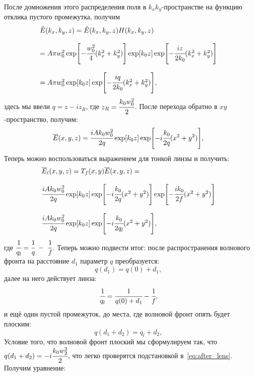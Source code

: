 \documentclass[14pt,a4paper]{extarticle}
\numberwithin{equation}{section}
\begin{document}
После домножения этого распределения поля в $k_xk_y$-пространстве на функцию отклика пустого промежутка, получим
\begin{equation}
	\label{eq:after_lens}
	\begin{array}{lcl}
	\hat{E}(k_x, k_y, z) = \hat{E}(k_x, k_y, z)H(k_x, k_y, z) 
	\\
	\\
	= A\pi w^2_0\exp[-\cfrac{w^2_0}{4}(k_x^2 + k_y^2)]\exp[k_0z]\exp[-\cfrac{iz}{2k_0}(k^2_x + k^2_y)]
	\\
	\\
	= A\pi w^2_0\exp[k_0z]\exp[-\cfrac{iq}{2k_0}(k^2_x + k^2_y)], 
	\end{array}
\end{equation}
здесь мы ввели $q = z - iz_R$, где $z_R = \cfrac{k_0w^2_0}{2}$. После перехода обратно в $xy$-пространство, получим: 
\begin{equation}
	\overline{E}(x, y, z) = \cfrac{iAk_0w^2_0}{2q}\exp[k_0z]\exp[-i\cfrac{k_0}{2q}(x^2 + y^2)],
\end{equation}
Теперь можно воспользоваться выражением для тонкой линзы и получить:
\begin{equation}
	\begin{array}{lcl}
	\overline{E}_{l}(x, y, z) = T_f(x, y)\overline{E}(x, y, z) = 
	\\
	\\
	\cfrac{iAk_0w^2_0}{2q}\exp[k_0z]\exp[-i\cfrac{k_0}{2q}(x^2 + y^2)]\exp[-\cfrac{ik_0}{2f}(x^2 + y^2)]
	\\
	\\
	\cfrac{iAk_0w^2_0}{2q}\exp[k_0z]\exp[-i\cfrac{k_0}{2q_l}(x^2 + y^2)],
	\end{array}
\end{equation}
где $\cfrac{1}{q_l} = \cfrac{1}{q} \; - \; \cfrac{1}{f}$. Теперь можно подвести итог: после распространения волнового фронта на расстояние $d_1$ параметр $q$ преобразуется:
\begin{equation}
	q(d_1) = q(0) + d_1, 
\end{equation}
далее на него действует линза: 
\begin{equation}
	\cfrac{1}{q_l} = \cfrac{1}{q(0) + d_1} - \cfrac{1}{f},
\end{equation}
и ещё один пустой промежуток, до места, где волновой фронт опять будет плоским: 
\begin{equation}
	q(d_1 + d_2) = q_l + d_2, 
\end{equation}
Условие того, что волновой фронт плоский мы сформулируем так, что $q(d_1 + d_2) = -i\cfrac{k_0w^2_2}{2}$, что легко проверятся подстановкой в~\ref{eq:after_lens}. Получим уравнение: 
\end{document}
